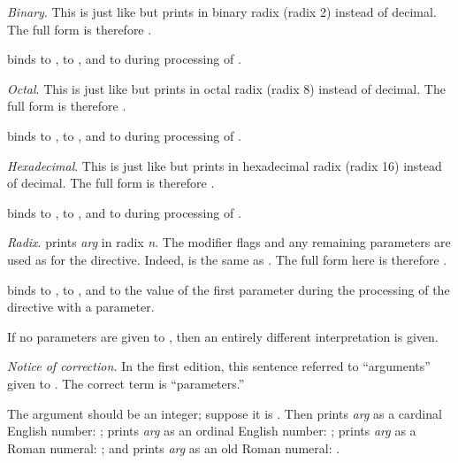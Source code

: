 \begin{flushdesc}
\item[\cd{{\Xtilde}B}]
\emph{Binary}.
This is just like  but prints in binary radix (radix 2)
instead of decimal.  The full form is therefore
.

 binds 
to ,  to , and  to 
during processing of .

\item[\cd{{\Xtilde}O}]
\emph{Octal}.
This is just like  but prints in octal radix (radix 8)
instead of decimal.  The full form is therefore
.

 binds 
to ,  to , and  to 
during processing of .

\item[\cd{{\Xtilde}X}]
\emph{Hexadecimal}.
This is just like  but prints in hexadecimal radix
(radix 16) instead of decimal.  The full form is therefore
.

 binds 
to ,  to , and  to 
during processing of .

\item[\cd{{\Xtilde}R}]
\emph{Radix}.
 prints \emph{arg} in radix \emph{n}.
The modifier flags and any remaining parameters are used as for
the  directive.
Indeed,  is the same as .  The full form here is therefore
.

 binds 
to ,  to , and  to the value
of the first parameter
during the processing of the  directive with a parameter.

If no parameters are given to , then an entirely different
interpretation is given.
\begin{new}%
\emph{Notice of correction.}
In the first edition, this sentence referred to ``arguments'' given to .
The correct term is ``parameters.''
\end{new}
The argument should be an integer;
suppose it is . Then
 prints \emph{arg} as a cardinal English number: ;
 prints \emph{arg} as an ordinal English number: ;
 prints \emph{arg} as a Roman numeral: ; and
 prints \emph{arg} as an old Roman numeral: .


\end{flushdesc}
